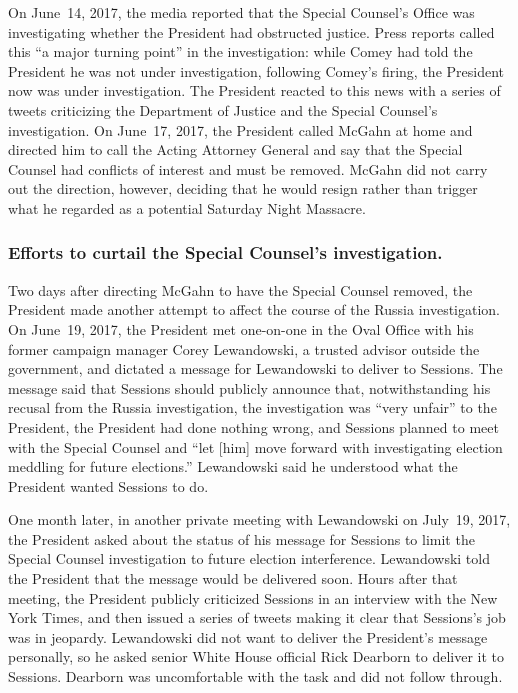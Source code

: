On June~14, 2017, the media reported that the Special Counsel's Office was investigating whether the President had obstructed justice.
Press reports called this ``a major turning point'' in the investigation: while Comey had told the President he was not under investigation, following Comey's firing, the President now was under investigation.
The President reacted to this news with a series of tweets criticizing the Department of Justice and the Special Counsel's investigation.
On June~17, 2017, the President called McGahn at home and directed him to call the Acting Attorney General and say that the Special Counsel had conflicts of interest and must be removed.
McGahn did not carry out the direction, however, deciding that he would resign rather than trigger what he regarded as a potential Saturday Night Massacre.

\subsubsection*{Efforts to curtail the Special Counsel's investigation.}

Two days after directing McGahn to have the Special Counsel removed, the President made another attempt to affect the course of the Russia investigation.
On June~19, 2017, the President met one-on-one in the Oval Office with his former campaign manager Corey Lewandowski, a trusted advisor outside the government, and dictated a message for Lewandowski to deliver to Sessions.
The message said that Sessions should publicly announce that, notwithstanding his recusal from the Russia investigation, the investigation was ``very unfair'' to the President, the President had done nothing wrong, and Sessions planned to meet with the Special Counsel and ``let [him] move forward with investigating election meddling for future elections.''
Lewandowski said he understood what the President wanted Sessions to do.

One month later, in another private meeting with Lewandowski on July~19, 2017, the President asked about the status of his message for Sessions to limit the Special Counsel investigation to future election interference.
Lewandowski told the President that the message would be delivered soon.
Hours after that meeting, the President publicly criticized Sessions in an interview with the New York Times, and then issued a series of tweets making it clear that Sessions's job was in jeopardy.
Lewandowski did not want to deliver the President's message personally, so he asked senior White House official Rick Dearborn to deliver it to Sessions.
Dearborn was uncomfortable with the task and did not follow through.

